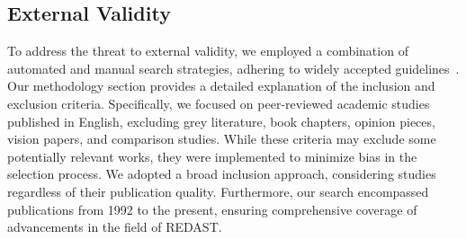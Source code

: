\subsection{External Validity}
To address the threat to external validity, we employed a combination of automated and manual search strategies, adhering to widely accepted guidelines~\cite{kitchenham2009systematic, wohlin2014guidelines}. Our methodology section provides a detailed explanation of the inclusion and exclusion criteria. Specifically, we focused on peer-reviewed academic studies published in English, excluding grey literature, book chapters, opinion pieces, vision papers, and comparison studies. While these criteria may exclude some potentially relevant works, they were implemented to minimize bias in the selection process. We adopted a broad inclusion approach, considering studies regardless of their publication quality. Furthermore, our search encompassed publications from 1992 to the present, ensuring comprehensive coverage of advancements in the field of REDAST.
